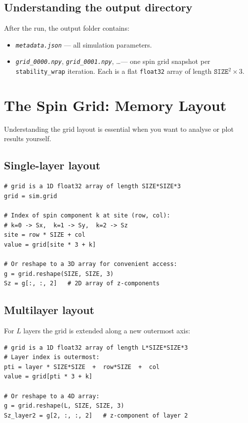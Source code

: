 \documentclass[12pt,a4paper]{article}
\newcommand{\code}[1]{\texttt{#1}}
\newcommand{\file}[1]{\texttt{\textit{#1}}}
\newcommand{\param}[1]{\texttt{#1}}
\begin{document}
\subsection{Understanding the output directory}

After the run, the output folder contains:
\begin{itemize}
  \item \file{metadata.json} --- all simulation parameters.
  \item \file{grid\_0000.npy}, \file{grid\_0001.npy}, \dots ---
        one spin grid snapshot per \param{stability\_wrap} iteration.
        Each is a flat \code{float32} array of length
        $\texttt{SIZE}^2 \times 3$.
\end{itemize}

\section{The Spin Grid: Memory Layout}
\label{sec:gridlayout}

Understanding the grid layout is essential when you want to analyse or plot
results yourself.

\subsection{Single-layer layout}

\begin{lstlisting}[style=python]
# grid is a 1D float32 array of length SIZE*SIZE*3
grid = sim.grid

# Index of spin component k at site (row, col):
# k=0 -> Sx,  k=1 -> Sy,  k=2 -> Sz
site = row * SIZE + col
value = grid[site * 3 + k]

# Or reshape to a 3D array for convenient access:
g = grid.reshape(SIZE, SIZE, 3)
Sz = g[:, :, 2]   # 2D array of z-components
\end{lstlisting}

\subsection{Multilayer layout}

For $L$ layers the grid is extended along a new outermost axis:

\begin{lstlisting}[style=python]
# grid is a 1D float32 array of length L*SIZE*SIZE*3
# Layer index is outermost:
pti = layer * SIZE*SIZE  +  row*SIZE  +  col
value = grid[pti * 3 + k]

# Or reshape to a 4D array:
g = grid.reshape(L, SIZE, SIZE, 3)
Sz_layer2 = g[2, :, :, 2]   # z-component of layer 2
\end{lstlisting}
\end{document}
